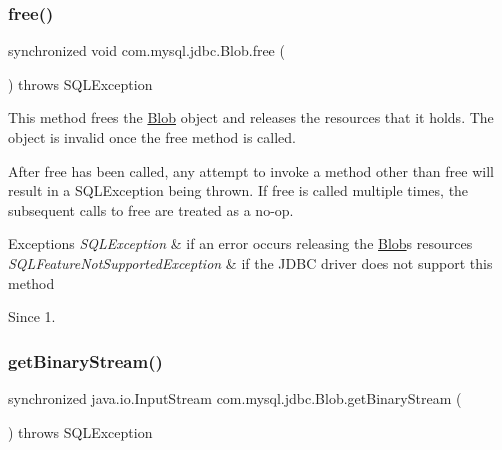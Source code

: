 \subsubsection{\texorpdfstring{free()}{free()}}
{\footnotesize\ttfamily synchronized void com.\+mysql.\+jdbc.\+Blob.\+free (\begin{DoxyParamCaption}{ }\end{DoxyParamCaption}) throws S\+Q\+L\+Exception}

This method frees the {\ttfamily \mbox{\hyperlink{classcom_1_1mysql_1_1jdbc_1_1_blob}{Blob}}} object and releases the resources that it holds. The object is invalid once the {\ttfamily free} method is called. 

After {\ttfamily free} has been called, any attempt to invoke a method other than {\ttfamily free} will result in a {\ttfamily S\+Q\+L\+Exception} being thrown. If {\ttfamily free} is called multiple times, the subsequent calls to {\ttfamily free} are treated as a no-\/op. 


\begin{DoxyExceptions}{Exceptions}
{\em S\+Q\+L\+Exception} & if an error occurs releasing the \mbox{\hyperlink{classcom_1_1mysql_1_1jdbc_1_1_blob}{Blob}}\textquotesingle{}s resources \\
\hline
{\em S\+Q\+L\+Feature\+Not\+Supported\+Exception} & if the J\+D\+BC driver does not support this method \\
\hline
\end{DoxyExceptions}
\begin{DoxySince}{Since}
1. 
\end{DoxySince}
\mbox{\label{classcom_1_1mysql_1_1jdbc_1_1_blob_a716c9113195aafa27a5a1f2eb50c230c}} 
\subsubsection{\texorpdfstring{get\+Binary\+Stream()}{getBinaryStream()}\hspace{0.1cm}{\footnotesize\ttfamily [1/2]}}
{\footnotesize\ttfamily synchronized java.\+io.\+Input\+Stream com.\+mysql.\+jdbc.\+Blob.\+get\+Binary\+Stream (\begin{DoxyParamCaption}{ }\end{DoxyParamCaption}) throws S\+Q\+L\+Exception}

